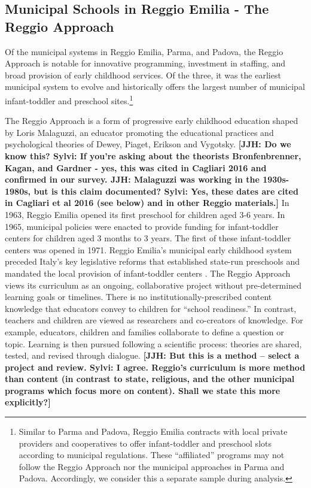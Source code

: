 
\subsection{Municipal Schools in Reggio Emilia - The Reggio Approach}

Of the municipal systems in Reggio Emilia, Parma, and Padova, the Reggio Approach is notable for innovative programming, investment in staffing, and broad provision of early childhood services. Of the three, it was the earliest municipal system to evolve and historically offers the largest number of municipal infant-toddler and preschool sites.\footnote{Similar to Parma and Padova, Reggio Emilia contracts with local private providers and cooperatives to offer infant-toddler and preschool slots according to municipal regulations. These ``affiliated'' programs may not follow the Reggio Approach nor the municipal approaches in Parma and Padova. Accordingly, we consider this a separate sample during analysis.} 

The Reggio Approach is a form of progressive early childhood education shaped by Loris Malaguzzi, an educator promoting the educational practices and psychological theories of Dewey, Piaget, Erikson and Vygotsky. \textbf{[JJH: Do we know this? Sylvi: If you're asking about the theorists Bronfenbrenner, Kagan, and Gardner - yes, this was cited in Cagliari 2016 and confirmed in our survey.  JJH: Malaguzzi was working in the 1930s-1980s, but is this claim documented? Sylvi: Yes, these dates are cited in Cagliari et al 2016 (see below) and in other Reggio materials.]} In 1963, Reggio Emilia opened its first preschool for children aged 3-6 years. In 1965, municipal policies were enacted to provide funding for infant-toddler centers for children aged 3 months to 3 years. The first of these infant-toddler centers was opened in 1971. Reggio Emilia's municipal early childhood system preceded Italy's key legislative reforms that established state-run preschools and mandated the local provision of infant-toddler centers \citep{Cagliari-etal-eds_2016_BOOK_Loris-Malaguzzi}. The Reggio Approach views its curriculum as an ongoing, collaborative project without pre-determined learning goals or timelines. There is no institutionally-prescribed content knowledge that educators convey to children for ``school readiness.'' In contrast, teachers and children are viewed as researchers and co-creators of knowledge. For example, educators, children and families collaborate to define a question or topic. Learning is then pursued following a scientific process: theories are shared, tested, and revised through dialogue. \textbf{[JJH: But this is a method -- select a project and review. Sylvi: I agree. Reggio's curriculum is more method than content (in contrast to state, religious, and the other municipal programs which focus more on content). Shall we state this more explicitly?]}

